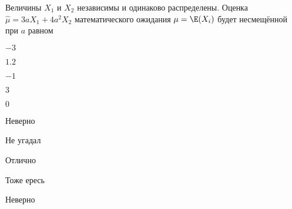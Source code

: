 
\begin{question}
Величины \(X_1\) и \(X_2\) независимы и одинаково распределены. Оценка
\(\hat\mu = 3aX_1 + 4a^2X_2\) математического ожидания \(\mu = \E(X_i)\)
будет несмещённой при \(a\) равном
\begin{answerlist}
  \item \(-3\)
  \item \(1.2\)
  \item \(-1\)
  \item \(3\)
  \item \(0\)
\end{answerlist}
\end{question}

\begin{solution}
\begin{answerlist}
  \item Неверно
  \item Не угадал
  \item Отлично
  \item Тоже ересь
  \item Неверно
\end{answerlist}
\end{solution}

